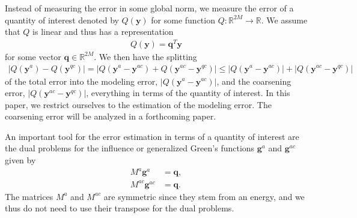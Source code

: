 \documentclass[11pt,reqno,oneside]{amsart}
\numberwithin{equation}{section}
\begin{document}
Instead of measuring the error in some global norm, we measure the error of a
quantity of interest denoted by $Q({\mathbf{y}})$ for some function $Q: {{\mathbb R}}^{2M}\to{{\mathbb R}}$.
We assume that $Q$ is linear and thus has a representation
\begin{align}
  Q({\mathbf{y}}) = {\mathbf{q}}^T {\mathbf{y}}
\end{align}
for some vector ${\mathbf{q}} \in {{\mathbb R}}^{2M}$.  We then have the splitting
\begin{align}
  | Q({\mathbf{y}}^a) - Q( {\mathbf{y}}^{qc}) |
  =   |Q({\mathbf{y}}^a - {\mathbf{y}}^{ac})  +  Q({\mathbf{y}}^{ac} - {\mathbf{y}}^{qc})|
  \le |Q({\mathbf{y}}^a - {\mathbf{y}}^{ac})| + |Q({\mathbf{y}}^{ac} - {\mathbf{y}}^{qc})|
\end{align}
of the total error into the modeling error, $|Q({\mathbf{y}}^a - {\mathbf{y}}^{ac})|$, and the
coarsening error, $|Q({\mathbf{y}}^{ac} - {\mathbf{y}}^{qc})|$, everything in terms of the
quantity of interest.  In this paper, we restrict ourselves to the estimation of
the modeling error.  The coarsening error will be analyzed in a forthcoming
paper.

An important tool for the error estimation in terms of a quantity of interest
are the dual problems for the influence or generalized Green's functions
${\mathbf{g}}^a$ and ${\mathbf{g}}^{ac}$ given by
\begin{equation} \label{EqDual}
\begin{split}
  M^{a}  {\mathbf{g}}^a   & = {\mathbf{q}}, \\
  M^{ac} {\mathbf{g}}^{ac} & = {\mathbf{q}}.
\end{split}
\end{equation}
The matrices $M^a$ and $M^{ac}$ are symmetric since they stem from an
energy, and we thus do not need to use their transpose for the dual problems.
\end{document}
